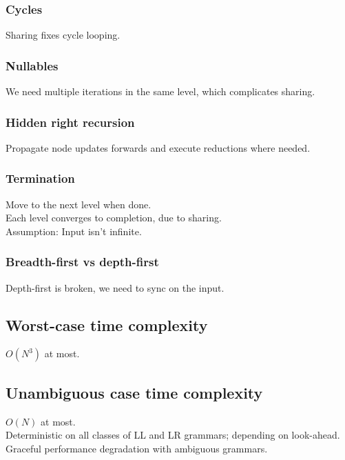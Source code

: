 \documentclass[a4paper,10pt]{article}
\begin{document}
\subsubsection{Cycles}

Sharing fixes cycle looping.

\subsubsection{Nullables}

We need multiple iterations in the same level, which complicates sharing.

\subsubsection{Hidden right recursion}

Propagate node updates forwards and execute reductions where needed.

\subsubsection{Termination}

Move to the next level when done.\\
Each level converges to completion, due to sharing.\\
Assumption: Input isn't infinite.

\subsubsection{Breadth-first vs depth-first}

Depth-first is broken, we need to sync on the input.

\subsection{Worst-case time complexity}

$O(N^3)$ at most.

\subsection{Unambiguous case time complexity}

$O(N)$ at most.\\
Deterministic on all classes of LL and LR grammars; depending on look-ahead.\\
Graceful performance degradation with ambiguous grammars.
\end{document}
